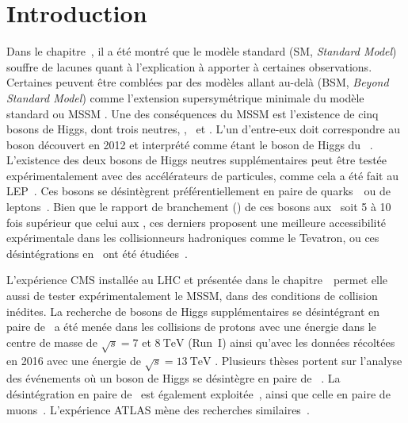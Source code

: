 \section{Introduction}\label{chapter-HTT_analysis-section-introduction}
Dans le chapitre~,
il a été montré que le modèle standard (SM, \emph{Standard Model}) souffre de lacunes quant à l'explication à apporter à certaines observations.
Certaines peuvent être comblées par des modèles allant au-delà (BSM, \emph{Beyond Standard Model}) comme l'extension supersymétrique minimale du modèle standard ou \og MSSM \fg.
Une des conséquences du MSSM est l'existence de cinq bosons de Higgs, dont trois neutres, \higgs, \Higgs\ et \HiggsA.
L'un d'entre-eux doit correspondre au boson découvert en 2012 et interprété comme étant le boson de Higgs du \SM~\cite{ATLAS_Higgs_discovery,CMS_Higgs_discovery,CMS_Higgs_discovery_2013,ATLAS-CMS-Higgs_combined_1,ATLAS-CMS-Higgs_combined_2}.
L'existence des deux bosons de Higgs neutres supplémentaires peut être testée expérimentalement avec des accélérateurs de particules,
comme cela a été fait au LEP~\cite{Schael:2006cr}.
Ces bosons se désintègrent préférentiellement en paire de quarks~\quarkb\ ou de leptons~\tau.
Bien que le rapport de branchement (\BR) de ces bosons aux \quarkb\ soit 5 à 10 fois supérieur que celui aux \tau,
ces derniers proposent une meilleure accessibilité expérimentale dans les collisionneurs hadroniques comme le Tevatron,
ou ces désintégrations en \tau\ ont été étudiées~\cite{Aaltonen:2009vf,Abazov:2011jh}.
\par
L'expérience CMS installée au LHC et présentée dans le chapitre~\ permet elle aussi de tester expérimentalement le MSSM, dans des conditions de collision inédites.
La recherche de bosons de Higgs supplémentaires se désintégrant en paire de \tau\ a été menée dans les collisions de protons avec une énergie dans le centre de masse de $\sqrt{s}=\num{7}$ et $\SI{8}{\TeV}$ (Run~I) \cite{Chatrchyan:2012vp,CMS-MSSM-HTT_2014,CMS-PAS-HIG-13-021,CMS-PAS-HIG-14-029} ainsi qu'avec les données récoltées en 2016 avec une énergie de $\sqrt{s}=\SI{13}{\TeV}$ \cite{CMS-PAS-HIG-17-020}.
Plusieurs thèses portent sur l'analyse des événements où un boson de Higgs se désintègre en paire de \tau~\cite{Gael_thesis,Artur_thesis}.
La désintégration en paire de \quarkb\ est également exploitée~\cite{Chatrchyan:2013qga,Khachatryan:2015tra},
ainsi que celle en paire de muons~\cite{CMS:2015ooa}.
L'expérience ATLAS mène des recherches similaires~\cite{Aad:2012cfr,ATLAS-MSSM-HTT_2018,ATLAS-MSSM-HTT_2020}.
\par
